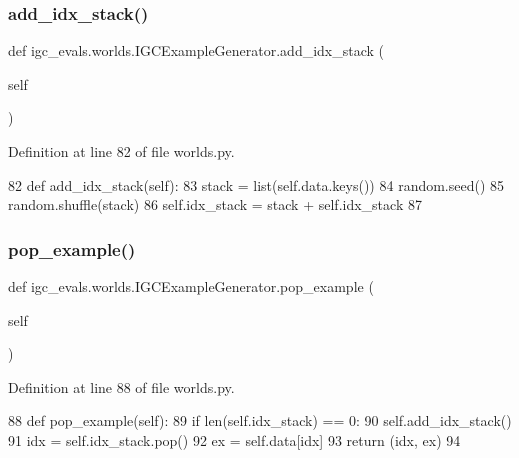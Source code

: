\subsubsection{\texorpdfstring{add\+\_\+idx\+\_\+stack()}{add\_idx\_stack()}}
{\footnotesize\ttfamily def igc\+\_\+evals.\+worlds.\+I\+G\+C\+Example\+Generator.\+add\+\_\+idx\+\_\+stack (\begin{DoxyParamCaption}\item[{}]{self }\end{DoxyParamCaption})}



Definition at line 82 of file worlds.\+py.


\begin{DoxyCode}
82     \textcolor{keyword}{def }add\_idx\_stack(self):
83         stack = list(self.data.keys())
84         random.seed()
85         random.shuffle(stack)
86         self.idx\_stack = stack + self.idx\_stack
87 
\end{DoxyCode}
\mbox{\label{classigc__evals_1_1worlds_1_1IGCExampleGenerator_a68420b6b80ae5d3a8825302359371ed5}} 
\subsubsection{\texorpdfstring{pop\+\_\+example()}{pop\_example()}}
{\footnotesize\ttfamily def igc\+\_\+evals.\+worlds.\+I\+G\+C\+Example\+Generator.\+pop\+\_\+example (\begin{DoxyParamCaption}\item[{}]{self }\end{DoxyParamCaption})}



Definition at line 88 of file worlds.\+py.


\begin{DoxyCode}
88     \textcolor{keyword}{def }pop\_example(self):
89         \textcolor{keywordflow}{if} len(self.idx\_stack) == 0:
90             self.add\_idx\_stack()
91         idx = self.idx\_stack.pop()
92         ex = self.data[idx]
93         \textcolor{keywordflow}{return} (idx, ex)
94 
\end{DoxyCode}
\mbox{\label{classigc__evals_1_1worlds_1_1IGCExampleGenerator_a34dc6ef46a9ba8a1c72c8b674ff444b9}} 
